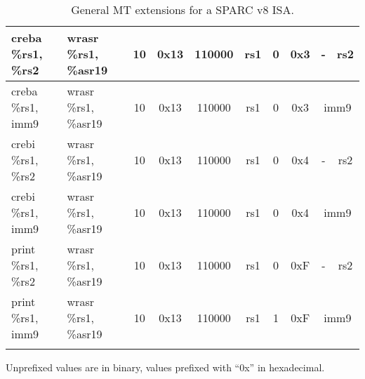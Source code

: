 \documentclass[a4paper,11pt]{article}
\begin{document}
\begin{table}
\begin{center}
{\begin{tabular}{|>{\ttfamily}l|>{\ttfamily}l||c|c|c|c|c|c|c|c|}
\hline \hline
creba \%rs1, \%rs2    & wrasr \%rs1, \%asr19 & 10 & 0x13 & 110000 &  rs1 & 0 & 0x3 & - & rs2 \\ \cline{9-10}
creba \%rs1, imm9     & wrasr \%rs1, \%asr19 & 10 & 0x13 & 110000 &  rs1 & 0 & 0x3 & \multicolumn{2}{c|}{imm9} \\ \cline{9-10}
crebi \%rs1, \%rs2    & wrasr \%rs1, \%asr19 & 10 & 0x13 & 110000 &  rs1 & 0 & 0x4 & - & rs2 \\ \cline{9-10}
crebi \%rs1, imm9     & wrasr \%rs1, \%asr19 & 10 & 0x13 & 110000 &  rs1 & 0 & 0x4 & \multicolumn{2}{c|}{imm9} \\ \cline{9-10}
print \%rs1, \%rs2    & wrasr \%rs1, \%asr19 & 10 & 0x13 & 110000 &  rs1 & 0 & 0xF & - & rs2 \\ \cline{9-10}
print \%rs1,  imm9    & wrasr \%rs1, \%asr19 & 10 & 0x13 & 110000 &  rs1 & 1 & 0xF & \multicolumn{2}{c|}{imm9} \\ \cline{9-10}
\hline
\end{tabular}
\caption{General MT extensions for a SPARC v8 ISA.}

Unprefixed values are in binary, values prefixed with ``0x'' in hexadecimal.}
\end{center}
\end{table}
\end{document}
